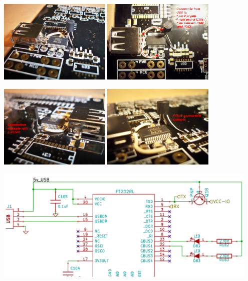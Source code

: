 \documentclass[12pt,a4paper,titlepage]{article}
\begin{document}
\begin{enumerate}
\includegraphics[width = 0.4\textwidth]{images/step12.jpg}
\includegraphics[width = 0.4\textwidth]{images/step13.png}

\includegraphics[width = 0.4\textwidth]{images/step14.png}
\includegraphics[width = 0.4\textwidth]{images/step15.png}

\includegraphics[width=0.95\textwidth]{images/FT232_sch.png}
\newline


\end{enumerate}
\end{document}
